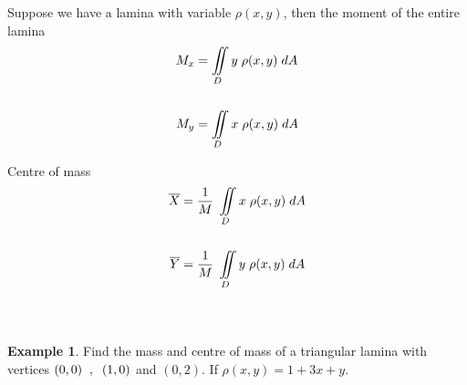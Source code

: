 \documentclass[11pt,a4paper]{article}
\theoremstyle{definition}
\newtheorem{exa}[thm]{Example}
\begin{document}
Suppose we have a lamina with variable $\rho (x,y)$, then the moment of the entire lamina
\begin{align*}
M_x & = \iint\limits_D y \hspace{0.1cm} \rho(x,y)\hspace{0.1cm}dA\\\\
M_y & = \iint\limits_D x \hspace{0.1cm} \rho(x,y)\hspace{0.1cm}dA
\end{align*}

Centre of mass 
\begin{align*}
\overline{X} & = \frac{1}{M} \hspace{0.1cm} \iint\limits_D x \hspace{0.1cm} \rho (x,y)\hspace{0.1cm} dA\\\\
\overline{Y} & = \frac{1}{M} \hspace{0.1cm} \iint\limits_D y \hspace{0.1cm} \rho (x,y)\hspace{0.1cm} dA\\\\\\
\end{align*}

\begin{exa}


Find the mass and centre of mass of a triangular lamina with vertices $(0,0)\hspace{0.2cm} , \hspace{0.2cm} (1,0)$ and $(0,2)$. If $\rho (x,y) = 1 + 3x + y$.
\end{exa}
\end{document}

